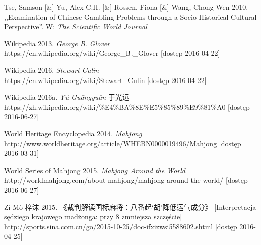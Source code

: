 Tse, Samson [\&] Yu, Alex C.H. [\&] Rossen, Fiona [\&] Wang, Chong-Wen
2010.
,,Examination of Chinese Gambling Problems through a Socio-Historical-Cultural Perspective''. W: \textit{The
Scientific World Journal}

Wikipedia 2013. \textit{George B. Glover}
\\https://en.wikipedia.org/wiki/George\_B.\_Glover [dostęp 2016-04-22]

Wikipedia 2016. \textit{Stewart Culin}
\\https://en.wikipedia.org/wiki/Stewart\_Culin [dostęp 2016-04-22]

Wikipedia 2016a. \textit{Yú Guāngyuǎn} 于光远
\\https://zh.wikipedia.org/wiki/\%E4\%BA\%8E\%E5\%85\%89\%E9\%81\%A0 [dostęp
2016-06-27]


World Heritage Encyclopedia 2014. \textit{Mahjong}
\\http://www.worldheritage.org/article/WHEBN0000019496/Mahjong [dostęp
2016-03-31]

World Series of Mahjong 2015. \textit{Mahjong Around the World}
\\http://worldmahjong.com/about-mahjong/mahjong-around-the-world/ [dostęp
2016-06-27]

Zǐ Mò 梓沫 2015. 《裁判解读国标麻将：八番起‘胡’降低运气成分》
[Interpretacja sędziego krajowego madżonga:
 przy 8  zmniejsza szczęście] %
\\http://sports.sina.com.cn/go/2015-10-25/doc-ifxizwsi5588602.shtml [dostęp 2016-04-25]



